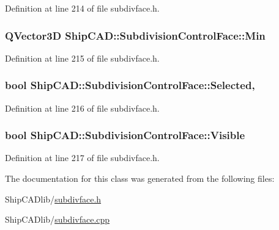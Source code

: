 Definition at line 214 of file subdivface.\-h.

\hypertarget{classShipCAD_1_1SubdivisionControlFace_a4d47101c36502d8c3c238af213698280}{
\subsubsection[{Min}]{\setlength{\rightskip}{0pt plus 5cm}Q\-Vector3\-D Ship\-C\-A\-D\-::\-Subdivision\-Control\-Face\-::\-Min\hspace{0.3cm}{\ttfamily [read]}}}\label{classShipCAD_1_1SubdivisionControlFace_a4d47101c36502d8c3c238af213698280}


Definition at line 215 of file subdivface.\-h.

\hypertarget{classShipCAD_1_1SubdivisionControlFace_a7f63b2e34b0a562f769cdd78b36e99b3}{
\subsubsection[{Selected}]{\setlength{\rightskip}{0pt plus 5cm}bool Ship\-C\-A\-D\-::\-Subdivision\-Control\-Face\-::\-Selected\hspace{0.3cm}{\ttfamily [read]}, {\ttfamily [write]}}}\label{classShipCAD_1_1SubdivisionControlFace_a7f63b2e34b0a562f769cdd78b36e99b3}


Definition at line 216 of file subdivface.\-h.

\hypertarget{classShipCAD_1_1SubdivisionControlFace_a7c049d1719ff65b722729b8adca26a7c}{
\subsubsection[{Visible}]{\setlength{\rightskip}{0pt plus 5cm}bool Ship\-C\-A\-D\-::\-Subdivision\-Control\-Face\-::\-Visible\hspace{0.3cm}{\ttfamily [read]}}}\label{classShipCAD_1_1SubdivisionControlFace_a7c049d1719ff65b722729b8adca26a7c}


Definition at line 217 of file subdivface.\-h.



The documentation for this class was generated from the following files\-:\begin{DoxyCompactItemize}
\item 
Ship\-C\-A\-Dlib/\hyperlink{subdivface_8h}{subdivface.\-h}\item 
Ship\-C\-A\-Dlib/\hyperlink{subdivface_8cpp}{subdivface.\-cpp}\end{DoxyCompactItemize}
